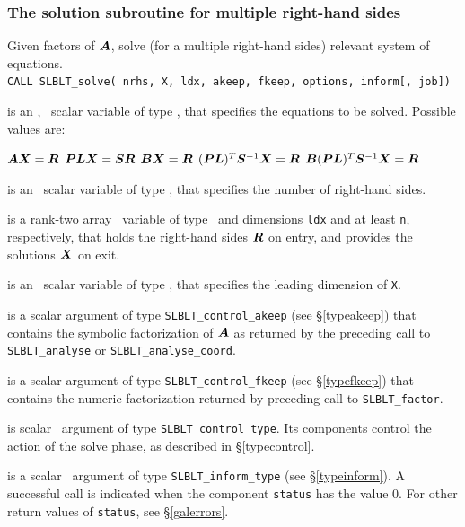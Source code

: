 \documentclass{galahad}
\newcommand{\packagename}{SLBLT}
\begin{document}

\subsubsection{The solution subroutine for multiple right-hand sides}

Given factors of ${\bm{A}}$, solve (for a multiple right-hand sides) relevant 
system of equations.\\

\hskip0.5in
{\tt CALL \packagename\_solve( nrhs, X, ldx, akeep, fkeep, options, inform{[}, job{]})}

\begin{description}

is an \optional, \intentin\ scalar variable of type \integer,
that specifies the equations to be solved. Possible values are:

\begin{description}
 ${\bm{A}}{\bm{X}}={\bm{R}}$
 ${\bm{P}}{\bm{L}}{\bm{X}}={\bm{S}}{\bm{R}}$
 ${\bm{B}}{\bm{X}}={\bm{R}}$
 $({\bm{P}}{\bm{L}})^T{\bm{S}}^{-1}{\bm{X}}={\bm{R}}$
 ${\bm{B}}({\bm{P}}{\bm{L}})^T{\bm{S}}^{-1}{\bm{X}}={\bm{R}}$
\end{description}

 is an \intentin\ scalar variable of type \integer,
that specifies the number of right-hand sides.

 is a rank-two array \intentinout\ variable of type \realdp\ and 
dimensions {\tt ldx} and at least {\tt n}, respectively,
that holds the right-hand sides ${\bm{R}}$ on entry, and provides the 
solutions ${\bm{X}}$ on exit.

 is an \intentin\ scalar variable of type \integer,
that specifies the leading dimension of {\tt X}.

 is a scalar \intentin argument of type
{\tt \packagename\_control\_akeep} (see \S\ref{typeakeep}) that contains the 
symbolic factorization of ${\bm{A}}$ as returned by the preceding call
to {\tt \packagename\_analyse} or {\tt \packagename\_analyse\_coord}.

 is a scalar \intentinout argument of type
{\tt \packagename\_control\_fkeep} (see \S\ref{typefkeep}) that contains the 
numeric factorization returned by preceding call to {\tt \packagename\_factor}.

 is scalar \intentin\ argument of type
{\tt \packagename\_control\_type}. Its components control the action
of the solve phase, as described in \S\ref{typecontrol}.

 is a scalar \intentinout\ argument of type
{\tt \packagename\_inform\_type} (see \S\ref{typeinform}).
A successful call is indicated when the  component {\tt status} has the value 0.
For other return values of {\tt status}, see \S\ref{galerrors}.

\end{description}
\end{document}

